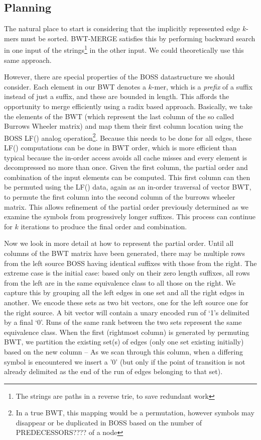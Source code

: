 \documentclass[doctor]{thesis}
\begin{document}
\subsection{Planning}

The natural place to start is considering that the implicitly represented edge $k$-mers must be sorted.  BWT-MERGE satisfies this by performing backward search in one input of the strings\footnote{The strings are paths in a reverse trie, to save redundant work} in the other input.  We could theoretically use this same approach.

However, there are special properties of the BOSS datastructure we should consider.  Each element in our BWT denotes a $k$-mer, which is a \emph{prefix} of a suffix instead of just a suffix, and these are bounded in length.  This affords the opportunity to merge efficiently using a radix based approach.  Basically, we take the elements of the BWT (which represent the last column of the so called Burrows Wheeler matrix) and map them  their first column  location using the BOSS LF() analog operation\footnote{In a true BWT, this mapping would be a permutation, however symbols may disappear or be duplicated in BOSS based on the number of PREDECESSORS???? of a node}.  Because this needs to be done for all edges, these LF() computations can be done in BWT order, which is more efficient than typical because the in-order access avoids all cache misses and every element is decompressed no more than once.  Given the first column, the partial order and combination of the input elements can be computed.  This first column can then be permuted using the LF() data, again as an in-order traversal of vector BWT, to permute the first column into the second column of the burrows wheeler matrix.  This allows refinement of the partial order previously determined as we examine the symbols from progressively longer suffixes.  This process can continue for $k$ iterations to produce the final order and combination.

Now we look in more detail at how to represent the partial order. Until all columns of the BWT matrix have been generated, there may be multiple rows from the left source BOSS having identical suffixes with those from the right.  The extreme case is the initial case:  based only on their zero length suffixes, all rows from the left are in the same equivalence class to all those on the right.   We capture this by grouping all the left edges in one set and all the right edges in another.   We encode these sets as two bit vectors, one for the left source one for the right source.  A bit vector will contain a unary encoded run of `1's delimited by a final `0'.  Runs of the same rank between the two sets represent the same equivalence class.  When the first (rightmost column) is generated by permuting BWT, we partition the existing set(s) of edges (only one set existing initially) based on the new column -- As we scan through this column, when a differing symbol is encountered we insert a '0' (but only if the point of transition is not already delimited as the end of the run of edges belonging to that set).
\end{document}
